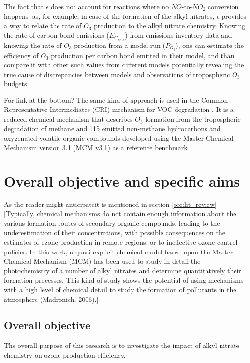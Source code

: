 \documentclass[11pt,a4paper]{article}
\begin{document}
The fact that $\epsilon$ does not account for reactions where no $NO$-to-$NO_2$ conversion happens, as, for example, in case of the formation of the alkyl nitrates, $\epsilon$ provides a way to relate the rate of $O_3$ production to the alkyl nitrate chemistry. Knowing the rate of carbon bond emissions ($E_{C_{bons}}$) from emissions inventory data and knowing the rate of $O_3$ production from a model run ($P_{O_3}$), one can estimate the efficiency of $O_3$ production per carbon bond emitted in their model, and than compare it with other such values from different models potentially revealing the true cause of discrepancies between models and observations of tropospheric $O_3$ budgets.

For link at the bottom? The same kind of approach is used in the Common Representative Intermediates (CRI) mechanism for VOC degradation \citep{Jenkin2002, Jenkin2008}. It is a reduced chemical mechanism that describes $O_3$ formation from the tropospheric degradation of methane and 115 emitted non-methane hydrocarbons and oxygenated volatile organic compounds developed using the Master Chemical Mechanism version 3.1 (MCM v3.1) as a reference benchmark
\section{Overall objective and specific aims}\label{sec:objams}
As the reader might anticipateit is mentioned in section \ref{sec:lit_review}
\citep{Sommariva2008}
[Typically, chemical mechanisms do not contain
enough information about the various formation routes of secondary organic compounds, leading to the underestimation of their concentrations, with possible consequences on the estimates of ozone production in remote regions, or to ineffective ozone-control policies. In this work, a quasi-explicit chemical model based upon the Master Chemical Mechanism (MCM) has been used to study in detail the photochemistry of a number of alkyl nitrates and determine quantitatively their formation processes. This kind of study shows the potential of using mechanisms with a high level of chemical detail to study the formation of pollutants in the atmosphere (Madronich, 2006).]
\subsection{Overall objective}\label{sec:objams_obj}
The overall purpose of this research is to investigate the impact of alkyl nitrate chemistry on ozone production efficiency.
\end{document}
